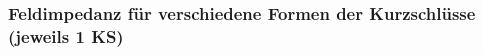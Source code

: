 \documentclass[accentcolor=tud9b, colorbacktitle, inverttitle]{tudbeamer}
\begin{document}
\begin{frame}\frametitle{Feldimpedanz f\"ur verschiedene Formen der Kurzschl\"usse (jeweils 1 KS)}
\vspace{-2em}
\begin{figure}[h]
	 \hspace{1em}
	\hspace{1em}
\end{figure}
\end{frame}
\end{document}
